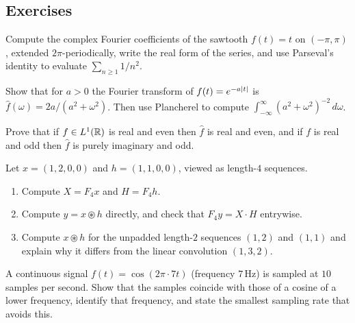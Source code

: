 \begin{notechapter}
\section*{Exercises}

\begin{exercise}\label{fourier-analysis:exr:1}
Compute the complex Fourier coefficients of the sawtooth $f(t) = t$ on $(-\pi,\pi)$, extended $2\pi$-periodically, write the real form of the series, and use Parseval's identity to evaluate $\sum_{n\ge1} 1/n^2$.
\end{exercise}

\begin{exercise}\label{fourier-analysis:exr:2}
Show that for $a > 0$ the Fourier transform of $f(t) = e^{-a\left|t\right|}$ is $\hat f(\omega) = 2a/(a^2+\omega^2)$. Then use Plancherel to compute $\int_{-\infty}^{\infty} (a^2+\omega^2)^{-2}\,d\omega$.
\end{exercise}

\begin{exercise}\label{fourier-analysis:exr:3}
Prove that if $f\in L^1(\mathbb{R})$ is real and even then $\hat f$ is real and even, and if $f$ is real and odd then $\hat f$ is purely imaginary and odd.
\end{exercise}

\begin{exercise}\label{fourier-analysis:exr:4}
Let $x = (1, 2, 0, 0)$ and $h = (1, 1, 0, 0)$, viewed as length-$4$ sequences.
\begin{enumerate}
\item Compute $X = F_4x$ and $H = F_4h$.
\item Compute $y = x \circledast h$ directly, and check that $F_4 y = X\cdot H$ entrywise.
\item Compute $x \circledast h$ for the unpadded length-$2$ sequences $(1,2)$ and $(1,1)$ and explain why it differs from the linear convolution $(1,3,2)$.
\end{enumerate}
\end{exercise}

\begin{exercise}\label{fourier-analysis:exr:5}
A continuous signal $f(t) = \cos(2\pi\cdot 7t)$ (frequency $7$\,Hz) is sampled at $10$ samples per second. Show that the samples coincide with those of a cosine of a lower frequency, identify that frequency, and state the smallest sampling rate that avoids this.
\end{exercise}

\end{notechapter}
